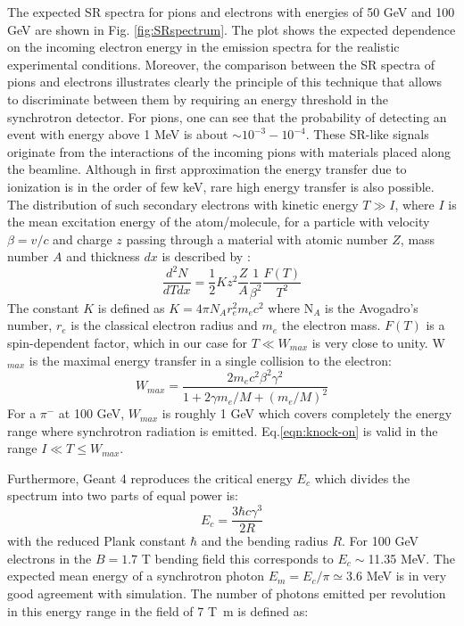 The expected SR spectra for pions and electrons with energies of 50 GeV and 100 GeV are shown in Fig. \ref{fig:SRspectrum}. The plot shows the expected dependence on the incoming electron energy in the emission spectra for the realistic experimental conditions. Moreover, the comparison between the SR spectra of pions and electrons illustrates clearly the principle of this technique that allows to discriminate between them by requiring an energy threshold in the synchrotron detector.  For pions, one can see that the probability of detecting an event with energy above 1 MeV is about $\sim 10^{-3}-10^{-4}$.
These SR-like signals originate from the interactions of the incoming pions with materials placed along the beamline. Although in first approximation the energy transfer due to ionization is in the order of few \si{\kilo\electronvolt}, rare high energy transfer is also possible. The distribution of such secondary electrons with
kinetic energy $T\gg I$, where $I$ is the mean excitation energy of the
atom/molecule, for a particle with velocity $\beta=v/c$ and charge $z$
passing through a material with atomic number $Z$, mass number $A$ and
thickness $dx$ is described by \cite{review-particle-physics}:
\begin{equation}
\frac{d^2N}{dTdx} = \frac{1}{2}K z^2 \frac{Z}{A}
\frac{1}{\beta^2}\frac{F(T)}{T^2}
\label{eqn:knock-on}
\end{equation}
The constant $K$ is defined as $K=4\pi N_A r_e^2 m_e c^2$ where N$_A$ is
the Avogadro's number, $r_e$ is the classical electron radius and $m_e$
the electron mass.
$F(T)$ is a spin-dependent factor, which in our case for $T \ll W_{max}$
is very close to unity. W$_{max}$ is the maximal energy transfer in a single collision to the
electron:
\begin{equation}
W_{max} = \frac{2m_e c^2 \beta^2 \gamma^2}{1+ 2\gamma m_e/M+(m_e/M)^2}
\end{equation}
For a $\pi^-$ at 100 GeV, $W_{max}$ is roughly 1 GeV which
covers completely the energy range where synchrotron radiation is
emitted. Eq.\ref{eqn:knock-on} is valid in the range $I\ll T \leq W_{max}$.
 \par 
Furthermore, Geant 4 reproduces the critical energy $E_c$ which divides the spectrum into two parts of equal power is:
\begin{equation}
E_c = \frac{3 \hbar c \gamma^3}{2R}
\end{equation}
with the reduced Plank constant $\hbar$ and the bending radius $R$. 
 For 100 GeV electrons in the  $B=1.7$ T bending field this corresponds to $E_c\sim$11.35 MeV. The expected mean energy of a synchrotron photon $E_m=E_c/\pi\simeq 3.6$ MeV is in very good agreement with simulation. The number of photons emitted per revolution in this energy range in the field of 7 \si{\tesla\meter} is defined as:
